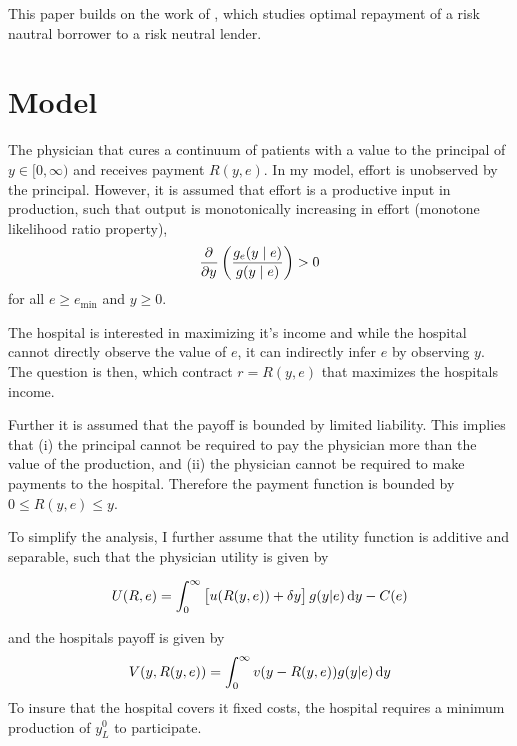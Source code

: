 This paper builds on the work of \textcite{Innes1990Limited}, which studies optimal repayment of a risk nautral borrower to a risk neutral lender.

\section{Model} %
\label{sec:model}
The physician that cures a continuum of patients with a value to the principal of $y\in[0,\infty)$ and receives payment $R(y,e)$.  In my model, effort is unobserved by the principal. However, it is assumed that effort is a productive input in production, such that output is monotonically increasing in effort (monotone likelihood ratio property),
	\begin{align}
		\pder{y}\left(\frac{g_e(y\mid e)}{g(y\mid e)}\right)>0 \label{eq:mlrp} 
	\end{align}
	for all $e\geq e_{\min}$ and $y\geq 0$. 
				
	The hospital is interested in maximizing it's income and while the hospital cannot directly observe the value of $e$, it can indirectly infer $e$ by observing $y$. The question is then, which contract $r=R(y,e)$ that maximizes the hospitals income.  
				
	Further it is assumed that the payoff is bounded by limited liability. This implies that (i) the principal cannot be required to pay the physician more than the value of the production, and (ii) the physician cannot be required to make payments to the hospital.  Therefore the payment function is bounded by $0\leq R(y,e)\leq y$.
				
	To simplify the analysis, I further assume that the utility function is additive and separable, such that the physician utility is given by 
				
	\begin{align}
		U(R,e)=\int_0^\infty \left[u(R(y,e))+\delta y\right]g(y|e)\dif y-C(e) \label{eq:utility} 
	\end{align}
				
	and the hospitals payoff is given by 
	\begin{align}
		V(y,R(y,e))=\int_0^\infty v(y-R(y,e))g(y|e)\dif y 
	\end{align}
	To insure that the hospital covers it fixed costs, the hospital requires a minimum production of $y_L^0$ to participate. 
				
